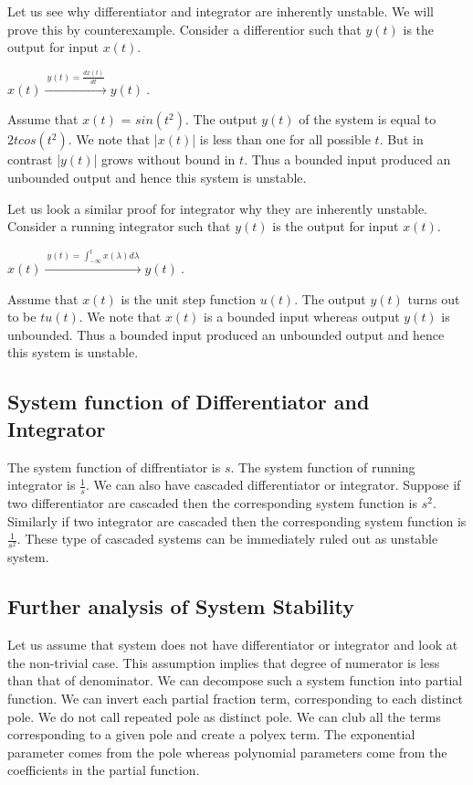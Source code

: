 Let us see why differentiator and integrator are inherently unstable. We will prove this by counterexample. Consider a differentior such that $y(t)$ is the output for input $x(t)$.
\begin{center}
$x(t) \xrightarrow{\ y(t)= \frac{dx(t)}{dt}\ } y(t)\  $.  \\
\end{center}
Assume that $x(t)$ = $sin(t^{2})$. The output $y(t)$ of the system is equal to $2tcos(t^{2})$. We note that |$x(t)$| is less than one for all possible $t$. But in contrast |$y(t)$| grows without bound in $t$. Thus a bounded input produced an unbounded output and hence this system is unstable.

Let us look a similar proof for integrator why they are inherently unstable. Consider a running integrator such that $y(t)$ is the output for input $x(t)$.
\begin{center}
$x(t) \xrightarrow{\ y(t)= \int_{-\infty}^{t}{x(\lambda)d\lambda} \ } y(t)\  $.  \\
\end{center}
Assume that $x(t)$ is the unit step function $u(t)$. The output $y(t)$ turns out to be  $tu(t)$. We note that $x(t)$ is a bounded input whereas output $y(t)$ is unbounded. Thus a bounded input produced an unbounded output and hence this system is unstable.

\subsection{System function of Differentiator and Integrator}
The system function of diffrentiator is $s$. The system function of running integrator is $\frac{1}{s}$. We can also have cascaded differentiator or integrator. Suppose if two differentiator are cascaded then the corresponding system function is $s^2$. Similarly if two integrator are cascaded then the corresponding system function is $\frac{1}{s^2}$. These type of cascaded systems can be immediately ruled out as unstable system. 

\subsection{Further analysis of System Stability}
Let us assume that system does not have differentiator or integrator and look at the non-trivial case. This assumption implies that degree of numerator is less than that of denominator. We can decompose such a system function into partial function. We can invert each partial fraction term, corresponding to each distinct pole. We do not call repeated pole as distinct pole. We can club all the terms corresponding to a given pole and create a polyex term. The exponential parameter comes from the pole whereas polynomial parameters come from the coefficients in the partial function.


